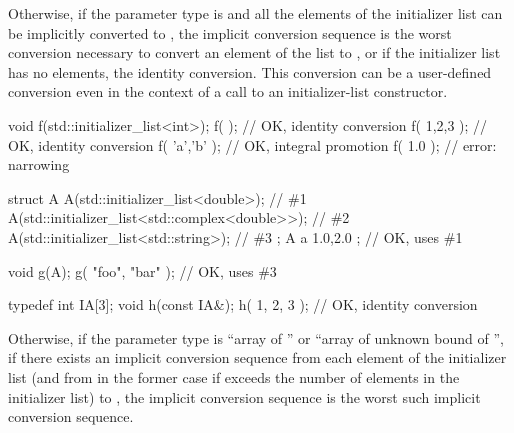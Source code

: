 \pnum
Otherwise, if the parameter type is 
and all the elements
of the initializer list can be implicitly converted to , the implicit
conversion sequence is the worst conversion necessary to convert an element of
the list to , or if the initializer list has no elements, the identity
conversion. This conversion can be a user-defined conversion even in
the context of a call to an initializer-list constructor.
\begin{example}
\begin{codeblock}
void f(std::initializer_list<int>);
f( {} );                        // OK,  identity conversion
f( {1,2,3} );                   // OK,  identity conversion
f( {'a','b'} );                 // OK,  integral promotion
f( {1.0} );                     // error: narrowing

struct A {
  A(std::initializer_list<double>);                     // \#1
  A(std::initializer_list<std::complex<double>>);       // \#2
  A(std::initializer_list<std::string>);                // \#3
};
A a{ 1.0,2.0 };                 // OK, uses \#1

void g(A);
g({ "foo", "bar" });            // OK, uses \#3

typedef int IA[3];
void h(const IA&);
h({ 1, 2, 3 });                 // OK, identity conversion
\end{codeblock}
\end{example}

\pnum
Otherwise, if the parameter type is ``array of  ''
or ``array of unknown bound of '',
if there exists an implicit conversion sequence
from each element of the initializer list
(and from \tcode{\{\}} in the former case
if  exceeds the number of elements in the initializer list)
to , the implicit conversion sequence is
the worst such implicit conversion sequence.

